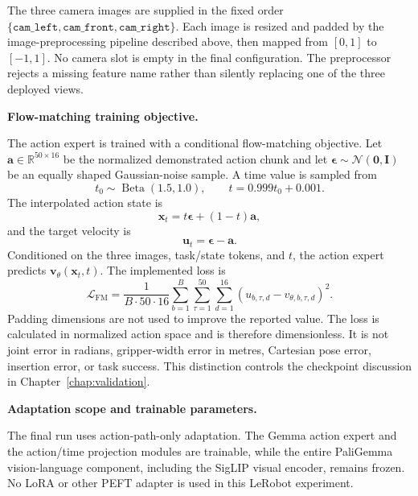 The three camera images are supplied in the fixed order
\(\{\texttt{cam\_left},\texttt{cam\_front},\texttt{cam\_right}\}\). Each image
is resized and padded by the image-preprocessing pipeline described above, then mapped from
\([0,1]\) to \([-1,1]\). No camera slot is empty in the final configuration.
The preprocessor rejects a missing feature name rather than silently replacing
one of the three deployed views.

\medskip
\noindent\textbf{Flow-matching training objective.}

The action expert is trained with a conditional flow-matching objective. Let
\(\mathbf a\in\mathbb R^{50\times16}\) be the normalized demonstrated action
chunk and let
\(\boldsymbol\epsilon\sim\mathcal N(\mathbf 0,\mathbf I)\) be an equally shaped
Gaussian-noise sample. A time value is sampled from
\[
t_0\sim\operatorname{Beta}(1.5,1.0),
\qquad
t=0.999t_0+0.001.
\]
The interpolated action state is
\begin{equation}
  \mathbf x_t=t\boldsymbol\epsilon+(1-t)\mathbf a,
  \label{eq:ch4-flow-state}
\end{equation}
and the target velocity is
\begin{equation}
  \mathbf u_t=\boldsymbol\epsilon-\mathbf a.
  \label{eq:ch4-flow-target}
\end{equation}
Conditioned on the three images, task/state tokens, and \(t\), the action
expert predicts \(\mathbf v_\theta(\mathbf x_t,t)\). The implemented loss is
\begin{equation}
  \mathcal L_{\mathrm{FM}}
  =
  \frac{1}{B\cdot50\cdot16}
  \sum_{b=1}^{B}
  \sum_{\tau=1}^{50}
  \sum_{d=1}^{16}
  \left(
  u_{b,\tau,d}
  -
  v_{\theta,b,\tau,d}
  \right)^2.
  \label{eq:ch4-flow-loss}
\end{equation}
Padding dimensions are not used to improve the reported value. The loss is
calculated in normalized action space and is therefore dimensionless. It is
not joint error in radians, gripper-width error in metres, Cartesian pose
error, insertion error, or task success. This distinction controls the
checkpoint discussion in Chapter~\ref{chap:validation}.

\medskip
\noindent\textbf{Adaptation scope and trainable parameters.}

The final run uses action-path-only adaptation. The Gemma action expert and the
action/time projection modules are trainable, while the entire PaliGemma
vision-language component, including the SigLIP visual encoder, remains frozen. No LoRA or other PEFT adapter is used in this LeRobot
experiment.

